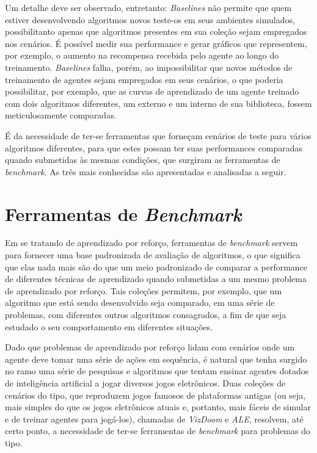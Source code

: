 \documentclass[cic,tc]{iiufrgs}
\begin{document}
Um detalhe deve ser observado, entretanto: \textit{Baselines} não permite que
quem estiver desenvolvendo algoritmos novos teste-os em seus ambientes
simulados, possibilitanto apenas que algoritmos presentes em sua coleção sejam
empregados nos cenários. É possível medir sua performance e gerar gráficos que
representem, por exemplo, o aumento na recompensa recebida pelo agente ao longo
do treinamento. \textit{Baselines} falha, porém, ao impossibilitar que novos
métodos de treinamento de agentes sejam empregados em seus cenários, o que
poderia possibilitar, por exemplo, que as curvas de aprendizado de um agente
treinado com dois algoritmos diferentes, um externo e um interno de sua
biblioteca, fossem meticulosamente comparadas.


É da necessidade de ter-se ferramentas que forneçam cenários de teste para
vários algoritmos diferentes, para que estes possam ter suas performances
comparadas quando submetidas às mesmas condições, que surgiram as ferramentas de
\textit{benchmark}. As três mais conhecidas são apresentadas e analisadas a
seguir.


\section{Ferramentas de \textit{Benchmark}}
\label{benchmark}

Em se tratando de aprendizado por reforço, ferramentas de \textit{benchmark}
servem para fornecer uma base padronizada de avaliação de algoritmos, o que
significa que elas nada mais são do que um meio padronizado de comparar a
performance de diferentes técnicas de aprendizado quando submetidas a um mesmo
problema de aprendizado por reforço. Tais coleções permitem, por exemplo, que
um algoritmo que está sendo desenvolvido seja comparado, em uma série de
problemas, com diferentes outros algoritmos consagrados, a fim de que seja
estudado o seu comportamento em diferentes situações.


Dado que problemas de aprendizado por reforço lidam com cenários onde um agente
deve tomar uma série de ações em sequência, é natural que tenha surgido no ramo
uma série de pesquisas e algoritmos que tentam ensinar agentes dotados de
inteligência artificial a jogar diversos jogos eletrônicos. Duas coleções de
cenários do tipo, que reproduzem jogos famosos de plataformas antigas (ou seja,
mais simples do que os jogos eletrônicos atuais e, portanto, mais fáceis de
simular e de treinar agentes para jogá-los), chamadas de \textit{VizDoom} e
\textit{ALE}, resolvem, até certo ponto, a necessidade de ter-se ferramentas
de \textit{benchmark} para problemas do tipo.
\end{document}
